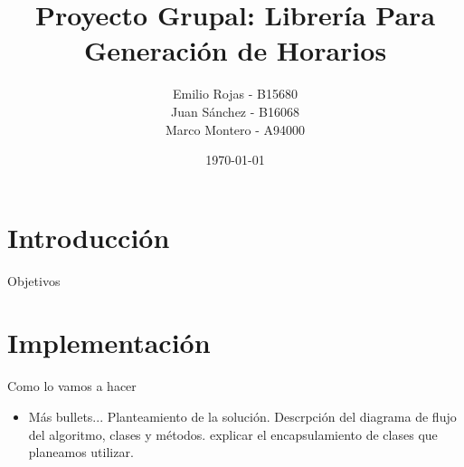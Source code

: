 \documentclass[10pt]{beamer}
\title{Proyecto Grupal: Librería Para Generación de Horarios}
\subtitle{}  %
\date{\today}
\author{
Emilio Rojas - B15680\\
  Juan Sánchez - B16068\\
  Marco Montero - A94000\\
  \href{mailto:}{{\tt}}
}
\institute[
  IE0217 - Estructuras de datos abstractas y algoritmos\\
  Escuela de Ingenieria Eléctrica\\
  Universidad de Costa Rica
] %
{%
  IE0217 - Estructuras de datos abstractas y algoritmos\\\
  Escuela de Ingenieria Eléctrica\\
  Universidad de Costa Rica

}
\begin{document}
\aauwavesbg

\begin{frame} %
\titlepage
\end{frame}


%









\section{Introducción}

\begin{frame}{Objetivos}{}
\begin{block}{}
  \begin{itemize}
  \end{itemize}

\end{block}
\end{frame}




\section{Implementación}
\begin{frame}{Como lo vamos a hacer}{}
\begin{block}{}

\begin{itemize}
\item Más bullets... Planteamiento de la solución. Descrpción del diagrama de flujo del algoritmo, clases y métodos. explicar el encapsulamiento de clases que planeamos utilizar.
\end{itemize}

\end{block}
\end{frame}
\end{document}
